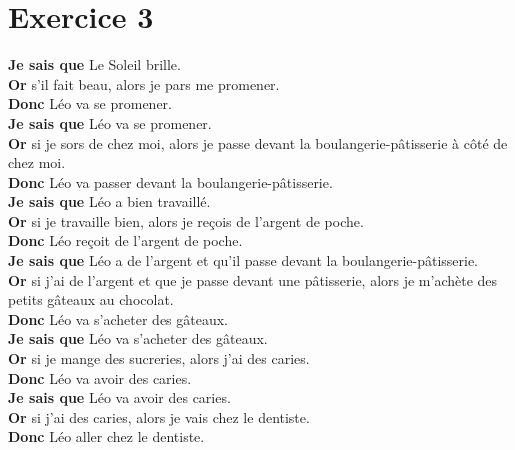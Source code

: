 \documentclass[12pt,a4paper]{article}
\begin{document}
\newpage

\section*{Exercice 3}

\noindent \textbf{Je sais que} Le Soleil brille.\\
\textbf{Or} s’il fait beau, alors je pars me promener.\\
\textbf{Donc} Léo va se promener.\\

\noindent \textbf{Je sais que} Léo va se promener.\\
\textbf{Or} si je sors de chez moi, alors je passe devant la boulangerie-pâtisserie à côté de chez moi.\\
\textbf{Donc} Léo va passer devant la boulangerie-pâtisserie.\\

\noindent \textbf{Je sais que} Léo a bien travaillé.\\
\textbf{Or} si je travaille bien, alors je reçois de l’argent de poche.\\
\textbf{Donc} Léo reçoit de l'argent de poche.\\

\noindent \textbf{Je sais que} Léo a de l'argent et qu'il passe devant la boulangerie-pâtisserie.\\
\textbf{Or} si j’ai de l’argent et que je passe devant une pâtisserie, alors je m’achète des petits gâteaux au chocolat.\\
\textbf{Donc} Léo va s'acheter des gâteaux.\\

\noindent \textbf{Je sais que} Léo va s'acheter des gâteaux.\\
\textbf{Or} si je mange des sucreries, alors j’ai des caries.\\
\textbf{Donc} Léo va avoir des caries.\\

\noindent \textbf{Je sais que} Léo va avoir des caries.\\
\textbf{Or} si j’ai des caries, alors je vais chez le dentiste.\\
\textbf{Donc} Léo aller chez le dentiste.\\
\end{document}

